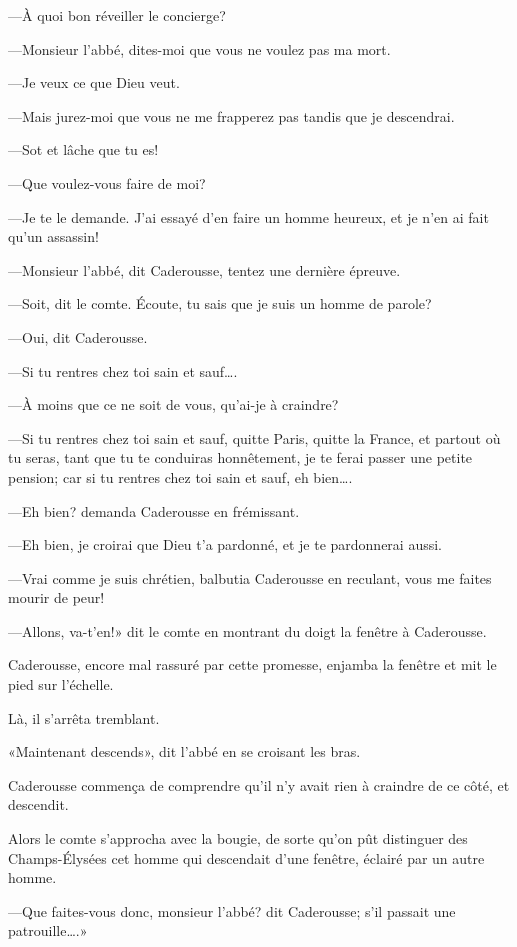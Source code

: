 —À quoi bon réveiller le concierge? 

—Monsieur l'abbé, dites-moi que vous ne voulez pas ma mort. 

—Je veux ce que Dieu veut. 

—Mais jurez-moi que vous ne me frapperez pas tandis que je descendrai. 

—Sot et lâche que tu es!  

—Que voulez-vous faire de moi? 

—Je te le demande. J'ai essayé d'en faire un homme heureux, et je n'en ai fait qu'un assassin! 

—Monsieur l'abbé, dit Caderousse, tentez une dernière épreuve. 

—Soit, dit le comte. Écoute, tu sais que je suis un homme de parole? 

—Oui, dit Caderousse. 

—Si tu rentres chez toi sain et sauf\dots. 

—À moins que ce ne soit de vous, qu'ai-je à craindre? 

—Si tu rentres chez toi sain et sauf, quitte Paris, quitte la France, et partout où tu seras, tant que tu te conduiras honnêtement, je te ferai passer une petite pension; car si tu rentres chez toi sain et sauf, eh bien\dots. 

—Eh bien? demanda Caderousse en frémissant. 

—Eh bien, je croirai que Dieu t'a pardonné, et je te pardonnerai aussi. 

—Vrai comme je suis chrétien, balbutia Caderousse en reculant, vous me faites mourir de peur! 

—Allons, va-t'en!» dit le comte en montrant du doigt la fenêtre à Caderousse. 

Caderousse, encore mal rassuré par cette promesse, enjamba la fenêtre et mit le pied sur l'échelle. 

Là, il s'arrêta tremblant. 

«Maintenant descends», dit l'abbé en se croisant les bras. 

Caderousse commença de comprendre qu'il n'y avait rien à craindre de ce côté, et descendit. 

Alors le comte s'approcha avec la bougie, de sorte qu'on pût distinguer des Champs-Élysées cet homme qui descendait d'une fenêtre, éclairé par un autre homme. 

—Que faites-vous donc, monsieur l'abbé? dit Caderousse; s'il passait une patrouille\dots.» 

